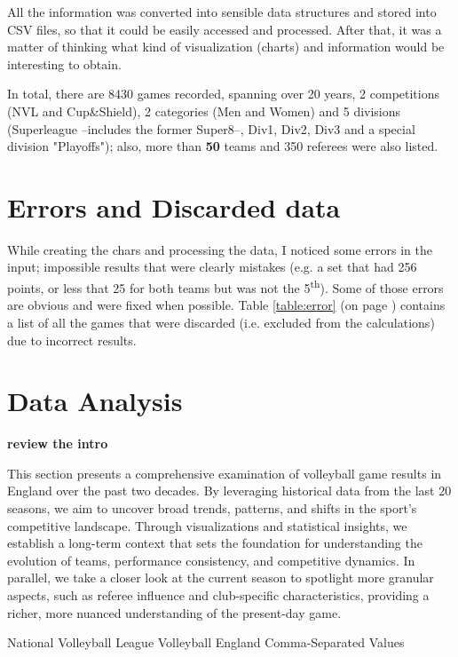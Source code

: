 \documentclass[10pt,a4paper,1.5lines]{article}
\newcommand{\todo}[1][ToDo]{
  \textcolor{WildStrawberry}{
    \Large{\textbf{#1}}
  }
}
\begin{document}
All the information was converted into sensible data structures and stored into \ac{CSV} files, so that it could be easily accessed and processed. After that, it was a matter of thinking what kind of visualization (charts) and information would be interesting to obtain.

In total, there are 8430 games recorded, spanning over 20 years, 2 competitions (\ac{NVL} and Cup\&Shield), 2 categories (Men and Women) and 5 divisions (Superleague --includes the former Super8--, Div1, Div2, Div3 and a special division "Playoffs"); also, more than \todo[50] teams and 350 referees were also listed.

\section{Errors and Discarded data}
While creating the chars and processing the data, I noticed some errors in the input; impossible results that were clearly mistakes (e.g. a set that had 256 points, or less that 25 for both teams but was not the 5\textsuperscript{th}). Some of those errors are obvious and were fixed when possible. Table \ref{table:error} (on page \pageref{table:error}) contains a list of all the games that were discarded (i.e. excluded from the calculations) due to incorrect results. 



\section{Data Analysis}
\todo[review the intro]
This section presents a comprehensive examination of volleyball game results in England over the past two decades. By leveraging historical data from the last 20 seasons, we aim to uncover broad trends, patterns, and shifts in the sport’s competitive landscape. Through visualizations and statistical insights, we establish a long-term context that sets the foundation for understanding the evolution of teams, performance consistency, and competitive dynamics. In parallel, we take a closer look at the current season to spotlight more granular aspects, such as referee influence and club-specific characteristics, providing a richer, more nuanced understanding of the present-day game.





\begin{acronym}[SINTICE]
   {National Volleyball League}
    {Volleyball England}
   {Comma-Separated Values}
\end{acronym}
\end{document}
